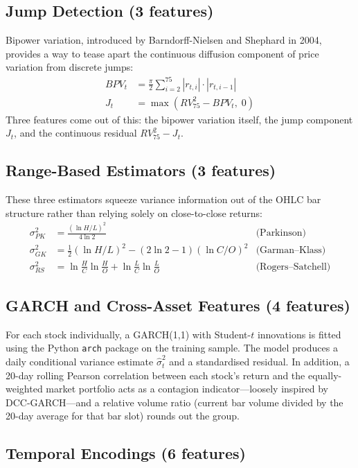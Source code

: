 \subsection{Jump Detection (3 features)}

Bipower variation, introduced by Barndorff-Nielsen and Shephard in 2004, provides a way to tease apart the continuous diffusion component of price variation from discrete jumps:
\begin{align}
BPV_t &= \frac{\pi}{2}\sum_{i=2}^{75}|r_{t,i}|\cdot|r_{t,i-1}| \\
J_t &= \max\!\left(RV_{75}^2 - BPV_t,\;0\right)
\end{align}
Three features come out of this: the bipower variation itself, the jump component $J_t$, and the continuous residual $RV_{75}^2 - J_t$.

\subsection{Range-Based Estimators (3 features)}

These three estimators squeeze variance information out of the OHLC bar structure rather than relying solely on close-to-close returns:
\begin{align}
\sigma_{PK}^2 &= \frac{(\ln H/L)^2}{4\ln 2} & \text{(Parkinson)} \\
\sigma_{GK}^2 &= \tfrac{1}{2}(\ln H/L)^2 - (2\ln 2 - 1)(\ln C/O)^2 & \text{(Garman--Klass)} \\
\sigma_{RS}^2 &= \ln\!\tfrac{H}{C}\ln\!\tfrac{H}{O}+\ln\!\tfrac{L}{C}\ln\!\tfrac{L}{O} & \text{(Rogers--Satchell)}
\end{align}

\subsection{GARCH and Cross-Asset Features (4 features)}

For each stock individually, a GARCH(1,1) with Student-$t$ innovations is fitted using the Python \texttt{arch} package on the training sample. The model produces a daily conditional variance estimate $\hat\sigma_t^2$ and a standardised residual. In addition, a 20-day rolling Pearson correlation between each stock's return and the equally-weighted market portfolio acts as a contagion indicator---loosely inspired by DCC-GARCH---and a relative volume ratio (current bar volume divided by the 20-day average for that bar slot) rounds out the group.

\subsection{Temporal Encodings (6 features)}

